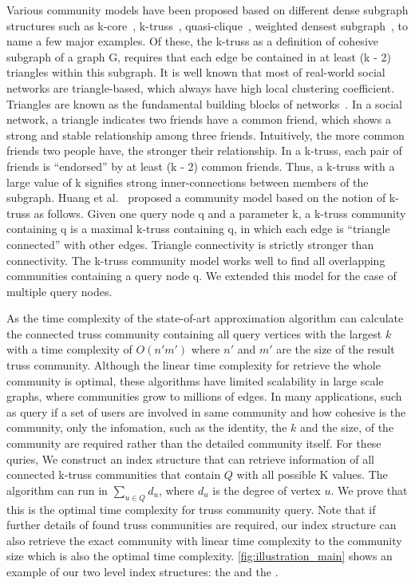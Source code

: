 Various community models have been proposed based on different dense subgraph structures such as k-core~\cite{sozio2010community,cui2014local,li2015influential}, k-truss~\cite{huang2014querying}, quasi-clique~\cite{cui2013online}, weighted densest subgraph~\cite{wu2015robust}, to name a few major examples. Of these, the k-truss as a definition of cohesive subgraph of a graph G, requires that each edge be contained in at least (k - 2) triangles within this subgraph. It is well known that most of real-world social networks are triangle-based, which always have high local clustering coefficient. Triangles are known as the fundamental building blocks of networks~\cite{wang2012truss}. In a social network, a triangle indicates two friends have a common friend, which shows a strong and stable relationship among three friends. Intuitively, the more common friends two people have, the stronger their relationship. In a k-truss, each pair of friends is "`endorsed"' by at least (k - 2) common friends. Thus, a k-truss with a large value of k signifies strong inner-connections between members of the subgraph. Huang et al.~\cite{huang2014querying} proposed a community model based on the notion of k-truss as follows. Given one query node q and a parameter k, a k-truss community containing q is a maximal k-truss containing q, in which each edge is "`triangle connected"' with other edges. Triangle connectivity is strictly stronger than connectivity. The k-truss community model works well to find all overlapping communities containing a query node q. We extended this model for the case of multiple query nodes. 


As the time complexity of the state-of-art approximation algorithm can calculate the connected truss community containing all query vertices with the largest $k$ with a time complexity of $O(n'm')$ where $n'$ and $m'$ are the size of the result truss community. Although the linear time complexity for retrieve the whole community is optimal, these algorithms have limited scalability in large scale graphs, where communities grow to millions of edges. In many applications, such as query if a set of users are involved in same community and how cohesive is the community, only the infomation, such as the identity, the $k$ and the size, of the community are required rather than the detailed community itself. For these quries, We construct an index structure that can retrieve information of all connected k-truss communities that contain $Q$ with all possible K values. The algorithm can run in $\sum_{u \in Q} d_u$, where $d_u$ is the degree of vertex $u$. We prove that this is the optimal time complexity for truss community query. Note that if further details of found truss communities are required, our index structure can also retrieve the exact community with linear time complexity to the community size which is also the optimal time complexity. \autoref{fig:illustration_main} shows an example of our two level index structures: the \inducedgraph{} and the \treeindex{}.

